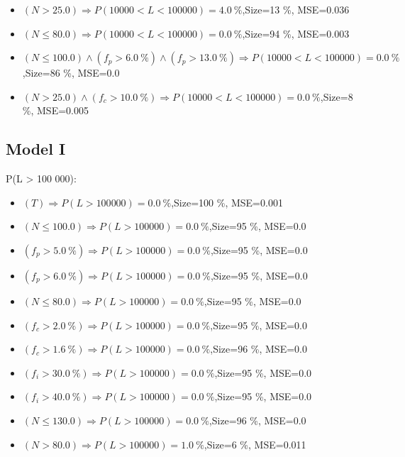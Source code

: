 \documentclass[numbered]{CSL}
\begin{document}
\begin{itemize}
\item $(N > 25.0) \Rightarrow P(10 000 < L < 100 000) = 4.0~\%$,\hfill Size=13 \%, MSE=0.036
\item $(N \leq 80.0) \Rightarrow P(10 000 < L < 100 000) = 0.0~\%$,\hfill Size=94 \%, MSE=0.003
\item $(N \leq 100.0) \land (f_p > 6.0~\%) \land (f_p > 13.0~\%) \Rightarrow P(10 000 < L < 100 000) = 0.0~\%$,\hfill Size=86 \%, MSE=0.0
\item $(N > 25.0) \land (f_c > 10.0~\%) \Rightarrow P(10 000 < L < 100 000) = 0.0~\%$,\hfill Size=8 \%, MSE=0.005
\end{itemize}

\subsection{Model I}
P(L > 100 000):
\begin{itemize}
\item $(T) \Rightarrow P(L > 100 000) = 0.0~\%$,\hfill Size=100 \%, MSE=0.001
\item $(N \leq 100.0) \Rightarrow P(L > 100 000) = 0.0~\%$,\hfill Size=95 \%, MSE=0.0
\item $(f_p > 5.0~\%) \Rightarrow P(L > 100 000) = 0.0~\%$,\hfill Size=95 \%, MSE=0.0
\item $(f_p > 6.0~\%) \Rightarrow P(L > 100 000) = 0.0~\%$,\hfill Size=95 \%, MSE=0.0
\item $(N \leq 80.0) \Rightarrow P(L > 100 000) = 0.0~\%$,\hfill Size=95 \%, MSE=0.0
\item $(f_c > 2.0~\%) \Rightarrow P(L > 100 000) = 0.0~\%$,\hfill Size=95 \%, MSE=0.0
\item $(f_c > 1.6~\%) \Rightarrow P(L > 100 000) = 0.0~\%$,\hfill Size=96 \%, MSE=0.0
\item $(f_i > 30.0~\%) \Rightarrow P(L > 100 000) = 0.0~\%$,\hfill Size=95 \%, MSE=0.0
\item $(f_i > 40.0~\%) \Rightarrow P(L > 100 000) = 0.0~\%$,\hfill Size=95 \%, MSE=0.0
\item $(N \leq 130.0) \Rightarrow P(L > 100 000) = 0.0~\%$,\hfill Size=96 \%, MSE=0.0
\item $(N > 80.0) \Rightarrow P(L > 100 000) = 1.0~\%$,\hfill Size=6 \%, MSE=0.011
\end{itemize}
\end{document}
